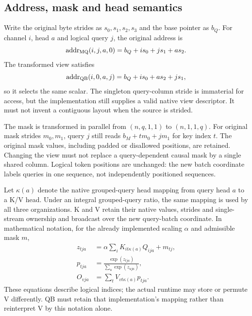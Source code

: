 \subsection{Address, mask and head semantics}
Write the original byte strides as $s_0,s_1,s_2,s_3$ and the base pointer as $b_Q$. For channel $i$, head $a$ and logical query $j$, the original address is
\begin{equation}
\operatorname{addr}_{\mathrm{MQ}}(i,j,a, 0)=b_Q+i s_0+j s_1+a s_2.
\end{equation}
The transformed view satisfies
\begin{equation}
\operatorname{addr}_{\mathrm{QB}}(i, 0,a,j)=b_Q+i s_0+a s_2+j s_1,
\label{eq:address}
\end{equation}
so it selects the same scalar. The singleton query-column stride is immaterial for access, but the implementation still supplies a valid native view descriptor. It must not invent a contiguous layout when the source is strided.

The mask is transformed in parallel from $(n,q, 1,1)$ to $(n, 1,1,q)$. For original mask strides $m_0,m_1$, query $j$ still reads $b_M+t m_0+j m_1$ for key index $t$. The original mask values, including padded or disallowed positions, are retained. Changing the view must not replace a query-dependent causal mask by a single shared column. Logical token positions are unchanged: the new batch coordinate labels queries in one sequence, not independently positioned sequences.

Let $\kappa(a)$ denote the native grouped-query head mapping from query head $a$ to a K/V head. Under an integral grouped-query ratio, the same mapping is used by all three organizations. K and V retain their native values, strides and single-stream ownership and broadcast over the new query-batch coordinate. In mathematical notation, for the already implemented scaling $\alpha$ and admissible mask $m$,
\begin{align}
 z_{tja}&=\alpha\sum_i K_{it\kappa(a)}Q_{ija}+m_{tj},\\
 p_{tja}&=\frac{\exp(z_{tja})}{\sum_u\exp(z_{uja})},\\
 O_{vja}&=\sum_t V_{vt\kappa(a)}p_{tja}.
\label{eq:attn}
\end{align}
These equations describe logical indices; the actual runtime may store or permute V differently. QB must retain that implementation's mapping rather than reinterpret V by this notation alone.

